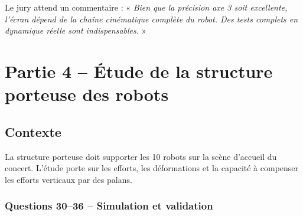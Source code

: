 \documentclass[12pt,a4paper,twoside]{article}
\begin{document}
\begin{correction}
  Le jury attend un commentaire : « \textit{Bien que la précision axe 3 soit excellente, l'écran dépend de la chaîne cinématique complète du robot. Des tests complets en dynamique réelle sont indispensables.} »
\end{correction}

\newpage

\section{Partie 4 -- Étude de la structure porteuse des robots}

\subsection*{Contexte}
La structure porteuse doit supporter les 10 robots sur la scène d'accueil du concert. L'étude porte sur les efforts, les déformations et la capacité à compenser les efforts verticaux par des palans.

\subsubsection{Questions 30--36 -- Simulation et validation}
\end{document}
